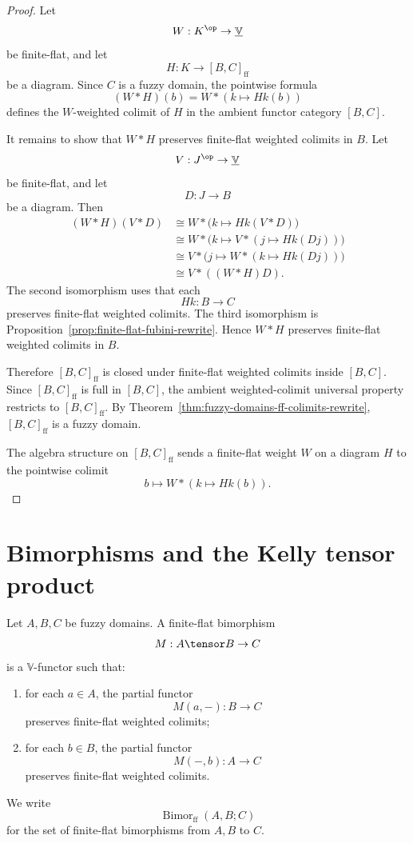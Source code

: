 \begin{proof}
Let
\[
    W:K^{\op}\to\underline{\mathbb V}
\]
be finite-flat, and let
\[
    H:K\to[B,C]_{\mathrm{ff}}
\]
be a diagram.  Since \(C\) is a fuzzy domain, the pointwise formula
\[
    (W*H)(b)
    =
    W*(k\mapsto Hk(b))
\]
defines the \(W\)-weighted colimit of \(H\) in the ambient functor category
\([B,C]\).

It remains to show that \(W*H\) preserves finite-flat weighted colimits in \(B\).
Let
\[
    V:J^{\op}\to\underline{\mathbb V}
\]
be finite-flat, and let
\[
    D:J\to B
\]
be a diagram.  Then
\[
\begin{aligned}
    (W*H)(V*D)
    &\cong
    W*\bigl(k\mapsto Hk(V*D)\bigr)
    \\
    &\cong
    W*\bigl(k\mapsto V*(j\mapsto Hk(Dj))\bigr)
    \\
    &\cong
    V*\bigl(j\mapsto W*(k\mapsto Hk(Dj))\bigr)
    \\
    &\cong
    V*((W*H)D).
\end{aligned}
\]
The second isomorphism uses that each
\[
    Hk:B\to C
\]
preserves finite-flat weighted colimits.  The third isomorphism is
Proposition~\ref{prop:finite-flat-fubini-rewrite}.  Hence \(W*H\) preserves
finite-flat weighted colimits in \(B\).

Therefore \([B,C]_{\mathrm{ff}}\) is closed under finite-flat weighted colimits
inside \([B,C]\).  Since \([B,C]_{\mathrm{ff}}\) is full in \([B,C]\), the
ambient weighted-colimit universal property restricts to
\([B,C]_{\mathrm{ff}}\).  By
Theorem~\ref{thm:fuzzy-domains-ff-colimits-rewrite},
\([B,C]_{\mathrm{ff}}\) is a fuzzy domain.

The algebra structure on \([B,C]_{\mathrm{ff}}\) sends a finite-flat weight
\(W\) on a diagram \(H\) to the pointwise colimit
\[
    b\longmapsto W*(k\mapsto Hk(b)).
\]
\end{proof}

\section{Bimorphisms and the Kelly tensor product}
\label{sec:bimorphisms-kelly-tensor-rewrite}

\begin{definition}
\label{def:finite-flat-bimorphism-rewrite}
Let \(A,B,C\) be fuzzy domains.  A finite-flat bimorphism
\[
    M:A\tensor B\to C
\]
is a \(\mathbb V\)-functor such that:
\begin{enumerate}
    \item for each \(a\in A\), the partial functor
    \[
        M(a,-):B\to C
    \]
    preserves finite-flat weighted colimits;
    \item for each \(b\in B\), the partial functor
    \[
        M(-,b):A\to C
    \]
    preserves finite-flat weighted colimits.
\end{enumerate}
We write
\[
    \operatorname{Bimor}_{\mathrm{ff}}(A,B;C)
\]
for the set of finite-flat bimorphisms from \(A,B\) to \(C\).
\end{definition}

